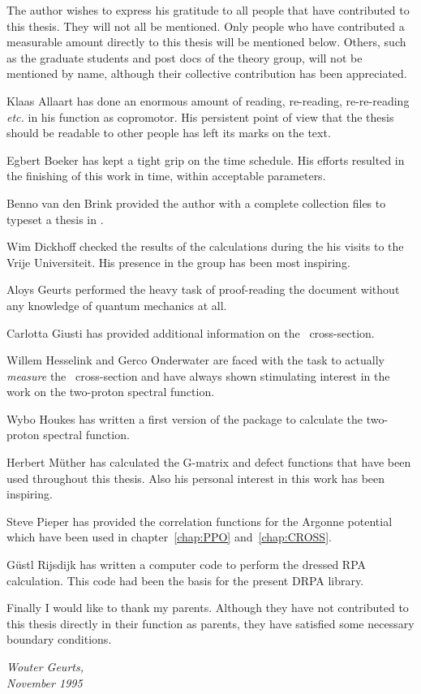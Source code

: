 The author wishes to express his gratitude to all people that have contributed
to this thesis. They will not all be mentioned. Only people who have 
contributed a measurable amount directly
to this thesis will be mentioned below. 
Others, such as the graduate students and post docs of the theory group, 
will not be mentioned by name, although their
collective contribution has been appreciated.

\vspace{5pt}
\noindent%
Klaas Allaart has done an enormous amount of reading, re-reading, 
re-re-reading {\em etc.} in his function as copromotor. 
His persistent point of view
that the thesis should be readable to other people has left its marks on the
text.

\noindent%
Egbert Boeker has kept a tight grip on the time schedule. His efforts resulted
in the finishing of this work in time, within acceptable parameters.

\noindent%
Benno van den Brink provided the author with a complete collection 
files to typeset a thesis in \LaTeXe. 

\noindent%
Wim Dickhoff checked the results of the calculations during the his visits
to the Vrije Universiteit. His presence in the group has been most inspiring.

\noindent%
Aloys Geurts performed the heavy task of proof-reading the document without
any knowledge of quantum mechanics at all. 

\noindent%
Carlotta Giusti has provided additional information on the \eepp\ 
cross-section.

\noindent%
Willem Hesselink and Gerco Onderwater are faced with the task to actually 
{\em measure} the \eepp\ cross-section and have always shown stimulating 
interest in the work on the two-proton spectral function.

\noindent%
Wybo Houkes has written a first version of the package to calculate the 
two-proton spectral function.

\noindent%
Herbert M\"uther has calculated the G-matrix and defect functions that have 
been used throughout this thesis. Also his personal interest in this work has
been inspiring. 

\noindent%
Steve Pieper has provided the correlation functions for the Argonne potential
which have been used in chapter~\ref{chap:PPO} and~\ref{chap:CROSS}.

\noindent%
G\"ustl Rijsdijk has written a computer code to perform the dressed RPA 
calculation. This code had been the basis for the present DRPA library.

\vspace{5pt}
\noindent%
Finally I would like to thank my parents. 
Although they have not contributed to this thesis directly in their function 
as parents, they have satisfied some necessary boundary conditions.

\vspace{20pt}
\noindent%
{\em Wouter Geurts, \\
November 1995}
